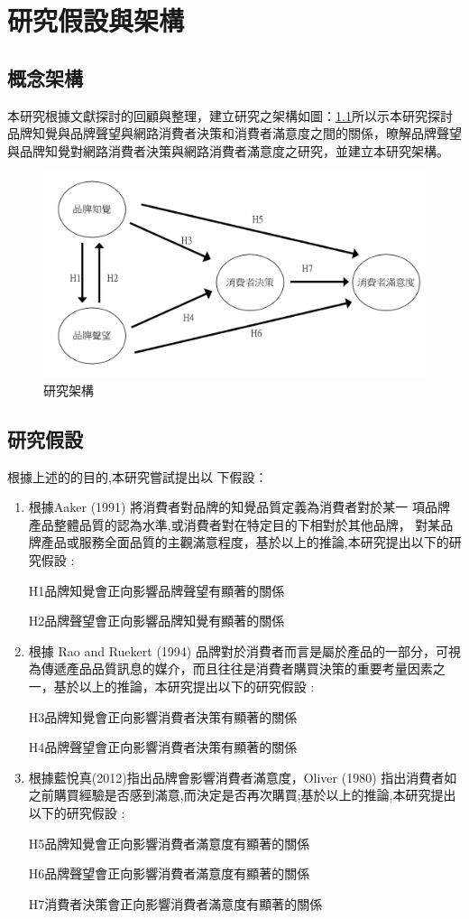 \chapter{研究假設與架構}
\section{概念架構}
本研究根據文獻探討的回顧與整理，建立研究之架構如圖：\ref{fig:ARC}所以示本研究探討品牌知覺與品牌聲望與網路消費者決策和消費者滿意度之間的關係，暸解品牌聲望與品牌知覺對網路消費者決策與網路消費者滿意度之研究，並建立本研究架構。


\begin{figure}[H]
\centering
\includegraphics[width=14cm]{images/論文架構.png}
\caption{研究架構}
\label{fig:ARC}
\end{figure}

\section{研究假設}
根據上述的的目的,本研究嘗試提出以 下假設：
\begin{enumerate}
\item 根據Aaker (1991) 將消費者對品牌的知覺品質定義為消費者對於某一 項品牌產品整體品質的認為水準,或消費者對在特定目的下相對於其他品牌， 對某品牌產品或服務全面品質的主觀滿意程度，基於以上的推論,本研究提出以下的研究假設 :

H1品牌知覺會正向影響品牌聲望有顯著的關係

H2品牌聲望會正向影響品牌知覺有顯著的關係

\item 根據 Rao and Ruekert (1994) 品牌對於消費者而言是屬於產品的一部分，可視為傳遞產品品質訊息的媒介，而且往往是消費者購買決策的重要考量因素之一，基於以上的推論，本研究提出以下的研究假設 :

H3品牌知覺會正向影響消費者決策有顯著的關係

H4品牌聲望會正向影響消費者決策有顯著的關係

\item 根據藍悅真(2012)指出品牌會影響消費者滿意度，Oliver (1980) 指出消費者如之前購買經驗是否感到滿意,而決定是否再次購買;基於以上的推論,本研究提出以下的研究假設 :

H5品牌知覺會正向影響消費者滿意度有顯著的關係

H6品牌聲望會正向影響消費者滿意度有顯著的關係

H7消費者決策會正向影響消費者滿意度有顯著的關係

\end{enumerate}

